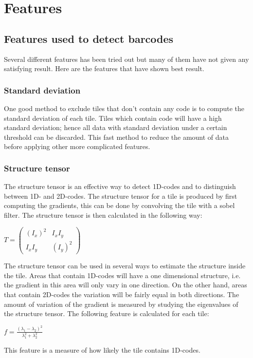 \chapter{Features}
\label{sec:Features}

\section{Features used to detect barcodes}
\label{sec:Features used to detect barcodes}
Several different features has been tried out but many of them have not given any satisfying result. Here are the features that have shown  best result.
\subsection{Standard deviation}
\label{sec:Standard deviation}
One good method to exclude tiles that don't contain any code is to compute the standard deviation of each tile. Tiles which contain code will have a high standard deviation; hence all data with standard deviation under a certain threshold can be discarded. This fast method to reduce the amount of data before applying other more complicated features. 

\subsection{Structure tensor}
\label{sec:Structure tensor}
The structure tensor is an effective way to detect 1D-codes and to distinguish between 1D- and 2D-codes. The structure tensor for a tile is produced by first computing the gradients, this can be done by convolving the tile with a sobel filter. The structure tensor is then calculated in the following way:
\begin{center}
\begin{math}
	T = \begin{pmatrix}
			(I_{x})^2 & I_{x}I_{y} \\ I_{x}I_{y} & (I_{y})^2
		\end{pmatrix}
\end{math}
\end{center}
The structure tensor can be used in several ways to estimate the structure inside the tile. Areas that contain 1D-codes will have a one dimensional structure, i.e. the gradient in this area will only vary in one direction. On the other hand, areas that contain 2D-codes the variation will be fairly equal in both directions. The amount of variation of the gradient is measured by studying the eigenvalues of the structure tensor. The following feature is calculated for each tile:
\begin{center}
\begin{math}
f = \frac{(\lambda_1 - \lambda_2)^2}{\lambda_1^2+\lambda_2^2}
\end{math}
\end{center}
This feature is a measure of how likely the tile contains 1D-codes.

